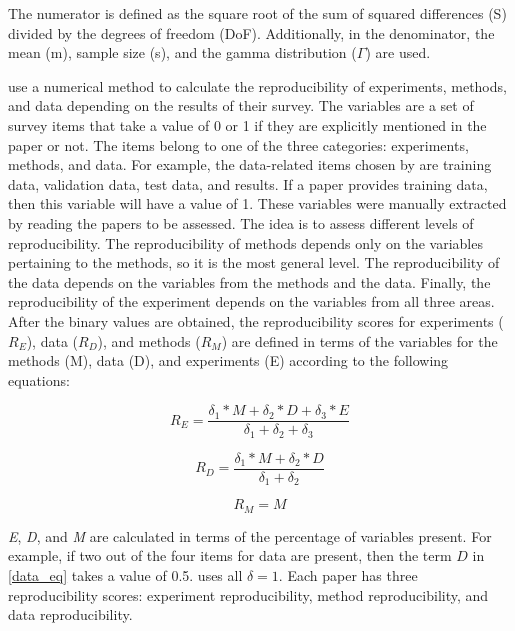 \documentclass[12pt, a4paper, twocolumn]{article}
\begin{document}
			\noindent The numerator is defined as the square root of the sum of squared differences (S) divided by the degrees of freedom (DoF). Additionally, in the denominator, the mean (m), sample size (s), and the gamma distribution ($\Gamma$) are used.


			\citet{gundersen2018state} use a numerical method to calculate the reproducibility of experiments, methods, and data depending on the results of their survey. The variables are a set of survey items that take a value of 0 or 1 if they are explicitly mentioned in the paper or not. The items belong to one of the three categories: experiments, methods, and data. For example, the data-related items chosen by \citet{gundersen2018state} are training data,  validation data, test data, and results. If a paper provides training data, then this variable will have a value of 1. These variables were manually extracted by reading the papers to be assessed. The idea is to assess different levels of reproducibility. The reproducibility of methods depends only on the variables pertaining to the methods, so it is the most general level. The reproducibility of the data depends on the variables from the methods and the data. Finally, the reproducibility of the experiment depends on the variables from all three areas. After the binary values are obtained, the reproducibility scores for experiments ($R_{E}$), data ($R_{D}$), and methods ($R_{M}$) are defined in terms of the variables for the methods (M), data (D), and experiments (E) according to the following equations:

			\begin{equation}
				R_{E} = \frac{\delta_1*M + \delta_2*D + \delta_3*E}{\delta_1 + \delta_2 + \delta_3}
			\end{equation}

			\begin{equation}\label{data_eq}
				R_{D} = \frac{\delta_1*M + \delta_2*D }{\delta_1 + \delta_2}
			\end{equation}

			\begin{equation}
				R_{M} = M 
			\end{equation}

			\textit{E}, \textit{D}, and \textit{M} are calculated in terms of the percentage of variables present. For example, if two out of the four items for data are present, then the term $D$ in \eqref{data_eq} takes a value of 0.5. \citet{gundersen2018state} uses all $\delta = 1$. Each paper has three reproducibility scores: experiment reproducibility, method reproducibility, and data reproducibility. 
\end{document}
